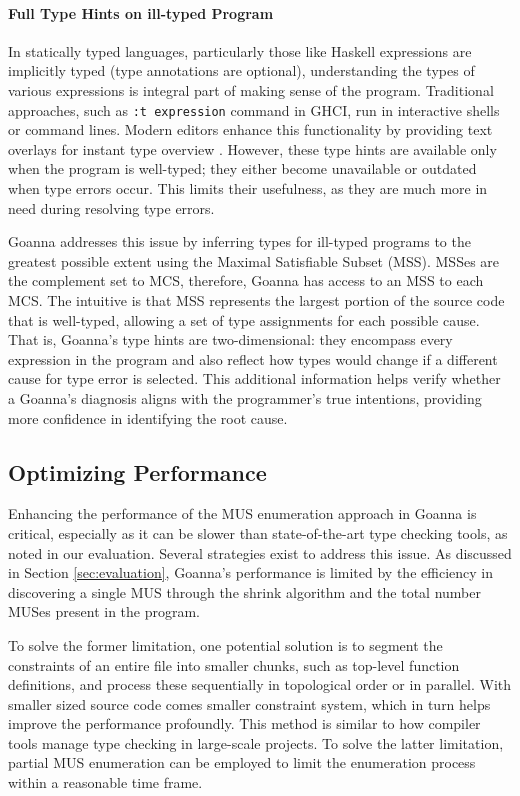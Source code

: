 \documentclass[pdflatex,sn-mathphys-num]{sn-jnl}%
\begin{document}
\paragraph{Full Type Hints on ill-typed Program}

In statically typed languages, particularly those like Haskell  expressions are implicitly typed (type annotations are optional), understanding the types of various expressions is integral part of making sense of the program. Traditional approaches, such as \texttt{:t expression} command in GHCI, run in interactive shells or command lines. Modern editors enhance this functionality by providing text overlays for instant type overview . However, these type hints are available only when the program is well-typed; they either become unavailable or outdated when type errors occur. This limits their usefulness, as they are much more in need during resolving type errors.

Goanna addresses this issue by inferring types for ill-typed programs to the greatest possible extent using the Maximal Satisfiable Subset (MSS). MSSes are the complement set to MCS, therefore, Goanna has access to an MSS to each MCS. The intuitive is that MSS represents the largest portion of the source code that is well-typed, allowing a set of  type assignments for each possible cause. That is, Goanna's type hints are two-dimensional: they encompass every expression in the program and also reflect how types would change if a different cause for type error is selected. This additional information helps verify whether a Goanna's diagnosis aligns with the programmer's true intentions, providing more confidence in identifying the root cause.

\subsection{Optimizing Performance}

Enhancing the performance of the MUS enumeration approach in Goanna is critical, especially as it can be slower than state-of-the-art type checking tools, as noted in our evaluation. Several strategies exist to address this issue. As discussed in Section \ref{sec:evaluation}, Goanna's performance is limited by the efficiency in discovering a single MUS through the shrink algorithm and the total number MUSes present in the program.

To solve the former limitation, one potential solution is to segment the constraints of an entire file into smaller chunks, such as top-level function definitions, and process these sequentially in topological order or in parallel. With smaller sized source code comes smaller constraint system, which in turn helps improve the performance profoundly. This method is similar to how compiler tools manage type checking in large-scale projects. To solve the latter limitation,  partial MUS enumeration \cite{Previti2013-mr, Liffiton2016-xi} can be employed to limit the enumeration process within a reasonable time frame.
\end{document}

